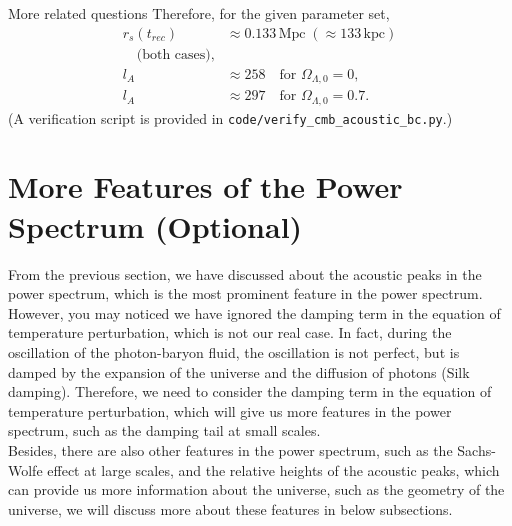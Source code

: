 \begin{example}{More related questions}{}
    Therefore, for the given parameter set,
    \begin{align*}
        r_s(t_{rec})&\approx 0.133\,\mathrm{Mpc}\;(\approx 133\,\mathrm{kpc}) \\
        \quad \text{(both cases)}, \\
        l_A&\approx 258 \quad \text{for }\Omega_{\Lambda,0}=0, \\
        l_A&\approx 297 \quad \text{for }\Omega_{\Lambda,0}=0.7.
    \end{align*}
    (A verification script is provided in \texttt{code/verify\_cmb\_acoustic\_bc.py}.)
\end{example}




\clearpage
\section{More Features of the Power Spectrum (Optional)}
From the previous section, we have discussed about the acoustic peaks in the power spectrum, which is the most prominent feature in the power spectrum. However, you may noticed we have ignored the damping term in the equation of temperature perturbation, which is not our real case. In fact, during the oscillation of the photon-baryon fluid, the oscillation is not perfect, but is damped by the expansion of the universe and the diffusion of photons (Silk damping). Therefore, we need to consider the damping term in the equation of temperature perturbation, which will give us more features in the power spectrum, such as the damping tail at small scales. \\

Besides, there are also other features in the power spectrum, such as the Sachs-Wolfe effect at large scales, and the relative heights of the acoustic peaks, which can provide us more information about the universe, such as the geometry of the universe, we will discuss more about these features in below subsections.

\bigskip \noindent \bigskip \noindent %
